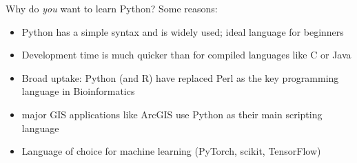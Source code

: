 \documentclass[xcolor=table]{beamer}
\begin{document}
\begin{frame}{Why do \textit{you} want to learn Python?}
    Some reasons:
    \pause
    \begin{itemize}
        \item Python has a simple syntax and is widely used; ideal language for beginners
            \pause
        \item Development time is much quicker than for compiled languages like C or Java
            \pause
        \item Broad uptake: Python (and R) have replaced Perl as the key programming language in Bioinformatics
            \pause
        \item major GIS applications like ArcGIS use Python as their main scripting language
        \item Language of choice for machine learning (PyTorch, scikit, TensorFlow)
            \pause
    \end{itemize}
\end{frame}

\end{document}

